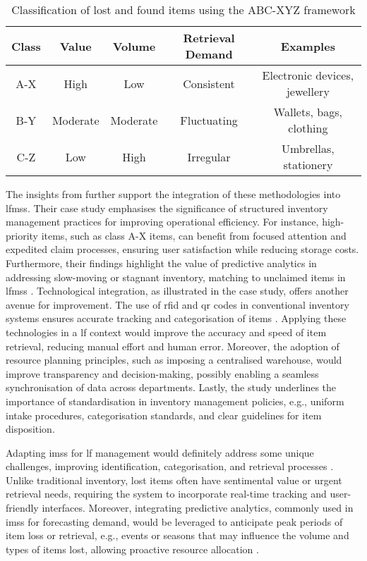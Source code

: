 \begin{table}[H]
\centering
\caption{Classification of lost and found items using the ABC-XYZ framework}
\begin{tabular}{|c|c|c|c|c|}
\hline
\textbf{Class} & \textbf{Value} & \textbf{Volume} & \textbf{Retrieval Demand} & \textbf{Examples} \\ 
\hline
A-X & High & Low & Consistent & Electronic devices, jewellery \\ 
\hline
B-Y & Moderate & Moderate & Fluctuating & Wallets, bags, clothing \\ 
\hline
C-Z & Low & High & Irregular & Umbrellas, stationery \\ 
\hline
\end{tabular}
\end{table}

The insights from  further support the integration of these methodologies into \acp{lfms}. Their case study emphasises the significance of structured inventory management practices for improving operational efficiency. For instance, high-priority items, such as class A-X items, can benefit from focused attention and expedited claim processes, ensuring user satisfaction while reducing storage costs. Furthermore, their findings highlight the value of predictive analytics in addressing slow-moving or stagnant inventory, matching to unclaimed items in \acp{lfms} \cite{Plinere2016}. Technological integration, as illustrated in the case study, offers another avenue for improvement. The use of \ac{rfid} and \ac{qr} codes in conventional inventory systems ensures accurate tracking and categorisation of items \cite{Plinere2016, Sohail2018}. Applying these technologies in a \ac{lf} context would improve the accuracy and speed of item retrieval, reducing manual effort and human error. Moreover, the adoption of resource planning principles, such as imposing a centralised warehouse, would improve transparency and decision-making, possibly enabling a seamless synchronisation of data across departments. Lastly, the  study underlines the importance of standardisation in inventory management policies, e.g., uniform intake procedures, categorisation standards, and clear guidelines for item disposition.

Adapting \acp{ims} for \ac{lf} management would definitely address some unique challenges, improving identification, categorisation, and retrieval processes \cite{Pauliina2024}. Unlike traditional inventory, lost items often have sentimental value or urgent retrieval needs, requiring the system to incorporate real-time tracking and user-friendly interfaces. Moreover, integrating predictive analytics, commonly used in \acp{ims} for forecasting demand, would be leveraged to anticipate peak periods of item loss or retrieval, e.g., events or seasons that may influence the volume and types of items lost, allowing proactive resource allocation \cite{Prabakaran2023}.

